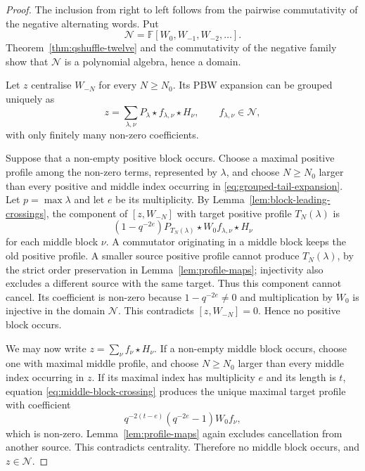 \documentclass[11pt]{extarticle}
\theoremstyle{definition}
\theoremstyle{remark}
\numberwithin{equation}{section}
\newcommand{\F}{\mathbb F}
\begin{document}
\begin{proof}
The inclusion from right to left follows from the pairwise commutativity of
the negative alternating words.  Put
\[
        \mathcal N=\F[W_0,W_{-1},W_{-2},\ldots].
\]
Theorem~\ref{thm:qshuffle-twelve} and the commutativity of the negative
family show that $\mathcal N$ is a polynomial algebra, hence a domain.

Let $z$ centralise $W_{-N}$ for every $N\geq N_0$.  Its PBW expansion can
be grouped uniquely as
\begin{equation}
\label{eq:grouped-tail-expansion}
        z=\sum_{\lambda,\nu}P_\lambda\star
        f_{\lambda,\nu}\star H_\nu,
        \qquad f_{\lambda,\nu}\in\mathcal N,
\end{equation}
with only finitely many non-zero coefficients.

Suppose that a non-empty positive block occurs.  Choose a maximal positive
profile among the non-zero terms, represented by $\lambda$, and choose
$N\geq N_0$ larger than every positive and middle index occurring in
\eqref{eq:grouped-tail-expansion}.  Let $p=\max\lambda$ and let $e$ be its
multiplicity.  By Lemma~\ref{lem:block-leading-crossings}, the component of
$[z,W_{-N}]$ with target positive profile $T_N(\lambda)$ is
\[
 (1-q^{-2e})P_{T_N(\lambda)}\star
 W_0f_{\lambda,\nu}\star H_\nu
\]
for each middle block $\nu$.  A commutator originating in a middle block
keeps the old positive profile.  A smaller source positive profile cannot
produce $T_N(\lambda)$, by the strict order preservation in
Lemma~\ref{lem:profile-maps}; injectivity also excludes a different source
with the same target.  Thus this component cannot cancel.  Its coefficient
is non-zero because $1-q^{-2e}\neq0$ and multiplication by $W_0$ is
injective in the domain $\mathcal N$.  This contradicts
$[z,W_{-N}]=0$.  Hence no positive block occurs.

We may now write $z=\sum_\nu f_\nu\star H_\nu$.  If a non-empty middle
block occurs, choose one with maximal middle profile, and choose $N\geq N_0$
larger than every middle index occurring in $z$.  If its maximal index has
multiplicity $e$ and its length is $t$, equation
\eqref{eq:middle-block-crossing} produces the unique maximal target profile
with coefficient
\[
        q^{-2(t-e)}(q^{-2e}-1)W_0f_\nu,
\]
which is non-zero.  Lemma~\ref{lem:profile-maps} again excludes
cancellation from another source.  This contradicts centrality.  Therefore
no middle block occurs, and $z\in\mathcal N$.
\end{proof}
\end{document}
